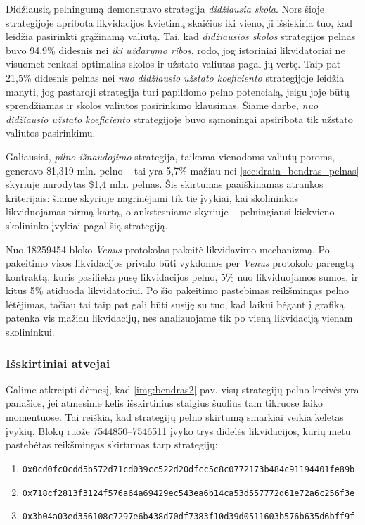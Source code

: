 \documentclass[]{VUMIFTemplateClass}
\begin{document}
Didžiausią pelningumą demonstravo strategija \textit{didžiausia skola}. Nors šioje strategijoje apribota likvidacijos kvietimų skaičius iki vieno, ji išsiskiria tuo, kad leidžia pasirinkti grąžinamą valiutą. Tai, kad \textit{didžiausios skolos} strategijos pelnas buvo 94,9\% didesnis nei \textit{iki uždarymo ribos}, rodo, jog istoriniai likvidatoriai ne visuomet renkasi optimalias skolos ir užstato valiutas pagal jų vertę. Taip pat 21,5\% didesnis pelnas nei \textit{nuo didžiausio užstato koeficiento} strategijoje leidžia manyti, jog pastaroji strategija turi papildomo pelno potencialą, jeigu joje būtų sprendžiamas ir skolos valiutos pasirinkimo klausimas. Šiame darbe, \textit{nuo didžiausio užstato koeficiento} strategijoje buvo sąmoningai apsiribota tik užstato valiutos pasirinkimu.

Galiausiai, \textit{pilno išnaudojimo} strategija, taikoma vienodoms valiutų poroms, generavo \$1,319 mln. pelno – tai yra 5,7\% mažiau nei \ref{sec:drain_bendras_pelnas} skyriuje nurodytas \$1,4 mln. pelnas. Šis skirtumas paaiškinamas atrankos kriterijais: šiame skyriuje nagrinėjami tik tie įvykiai, kai skolininkas likviduojamas pirmą kartą, o ankstesniame skyriuje – pelningiausi kiekvieno skolininko įvykiai pagal šią strategiją.

Nuo 18259454 \cite{LikvidacijosKontraktas} bloko \textit{Venus} protokolas pakeitė likvidavimo mechanizmą. Po pakeitimo visos likvidacijos privalo būti vykdomos per \textit{Venus} protokolo parengtą kontraktą, kuris pasilieka pusę likvidacijos pelno, 5\% nuo likviduojamos sumos, ir kitus 5\% atiduoda likvidatoriui. Po šio pakeitimo pastebimas reikšmingas pelno lėtėjimas, tačiau tai taip pat gali būti susiję su tuo, kad laikui bėgant į grafiką patenka vis mažiau likvidacijų, nes analizuojame tik po vieną likvidaciją vienam skolininkui.

\subsubsection{Išskirtiniai atvejai}
Galime atkreipti dėmesį, kad \ref{img:bendras2} pav. visų strategijų pelno kreivės yra panašios, jei atmesime kelis išskirtinius staigius šuolius tam tikruose laiko momentuose. Tai reiškia, kad strategijų pelno skirtumą smarkiai veikia keletas įvykių. Blokų ruože 7544850–7546511 įvyko trys didelės likvidacijos, kurių metu pastebėtas reikšmingas skirtumas tarp strategijų:

\begin{enumerate}[label=\textbf{\Alph*.}]
    \item \texttt{0x0cd0fc0cdd5b572d71cd039cc522d20dfcc5c8c0772173b484c91194401fe89b}
    \item \texttt{0x718cf2813f3124f576a64a69429ec543ea6b14ca53d557772d61e72a6c256f3e}
    \item \texttt{0x3b04a03ed356108c7297e6b438d70df7383f10d39d0511603b576b635d6bff9f}
\end{enumerate}
\end{document}
